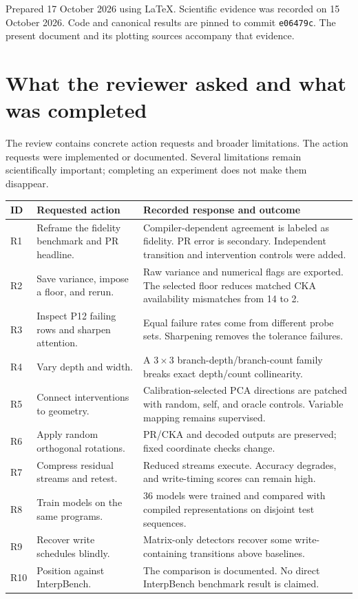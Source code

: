 \documentclass[10pt,a4paper]{article}
\newcommand{\newsection}[1]{\clearpage\section{#1}}
\begin{document}
\vfill
{\small\color{muted}Prepared 17 October 2026 using LaTeX. Scientific evidence was recorded on 15 October 2026. Code and canonical results are pinned to commit \texttt{e06479c}. The present document and its plotting sources accompany that evidence.}
\clearpage
\tableofcontents

\newsection{What the reviewer asked and what was completed}
The review contains concrete action requests and broader limitations. The action requests were implemented or documented. Several limitations remain scientifically important; completing an experiment does not make them disappear.
\par
\begingroup\small
\begin{tabularx}{\linewidth}{@{}P{.07\linewidth}P{.28\linewidth}X@{}}
\toprule
ID & Requested action & Recorded response and outcome\\
\midrule
R1 & Reframe the fidelity benchmark and PR headline. & Compiler-dependent agreement is labeled as fidelity. PR error is secondary. Independent transition and intervention controls were added.\\
R2 & Save variance, impose a floor, and rerun. & Raw variance and numerical flags are exported. The selected floor reduces matched CKA availability mismatches from 14 to 2.\\
R3 & Inspect P12 failing rows and sharpen attention. & Equal failure rates come from different probe sets. Sharpening removes the tolerance failures.\\
R4 & Vary depth and width. & A $3\times3$ branch-depth/branch-count family breaks exact depth/count collinearity.\\
R5 & Connect interventions to geometry. & Calibration-selected PCA directions are patched with random, self, and oracle controls. Variable mapping remains supervised.\\
R6 & Apply random orthogonal rotations. & PR/CKA and decoded outputs are preserved; fixed coordinate checks change.\\
R7 & Compress residual streams and retest. & Reduced streams execute. Accuracy degrades, and write-timing scores can remain high.\\
R8 & Train models on the same programs. & 36 models were trained and compared with compiled representations on disjoint test sequences.\\
R9 & Recover write schedules blindly. & Matrix-only detectors recover some write-containing transitions above baselines.\\
R10 & Position against InterpBench. & The comparison is documented. No direct InterpBench benchmark result is claimed.\\
\bottomrule
\end{tabularx}
\endgroup
\end{document}
